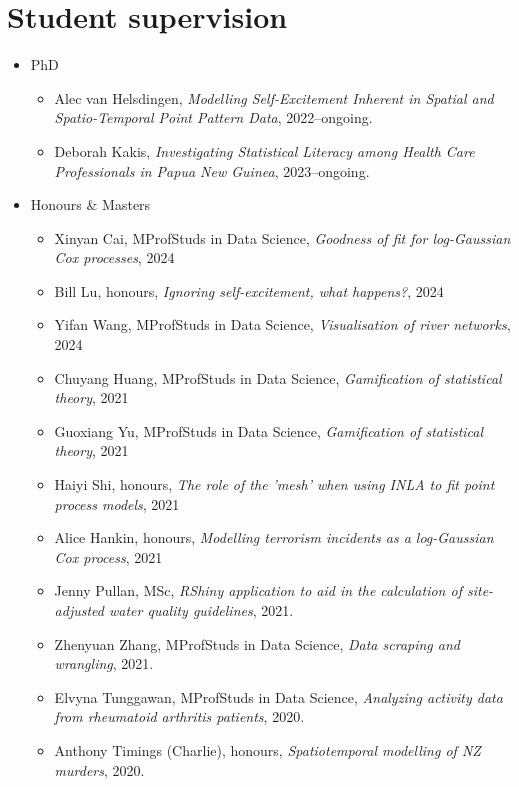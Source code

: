 \documentclass[10pt,a4paper]{moderncv}
\begin{document}
\newpage
\section{Student supervision}

\vspace{6pt}

\begin{itemize}
  \item PhD
  \begin{itemize}
  \item Alec van Helsdingen, \textit{Modelling Self-Excitement Inherent in Spatial and Spatio-Temporal Point Pattern Data}, 2022--ongoing.
   \item Deborah Kakis, \textit{Investigating Statistical Literacy among Health Care Professionals in Papua New Guinea}, 2023--ongoing.
  \end{itemize}
\item Honours \& Masters
  \begin{itemize}
  \item Xinyan Cai, MProfStuds in Data Science, \textit{Goodness of fit for log-Gaussian Cox processes}, 2024 
  \item Bill Lu, honours, \textit{Ignoring self-excitement, what happens?}, 2024
  \item Yifan Wang, MProfStuds in Data Science, \textit{Visualisation of river networks}, 2024
  \item Chuyang Huang, MProfStuds in Data Science, \textit{Gamification of statistical theory}, 2021
  \item Guoxiang Yu, MProfStuds in Data Science, \textit{Gamification of statistical theory}, 2021
  \item Haiyi Shi, honours, \textit{The role of the 'mesh' when using INLA to fit point process models}, 2021
  \item Alice Hankin, honours, \textit{Modelling terrorism incidents as a log-Gaussian Cox process}, 2021
  \item Jenny Pullan, MSc, \textit{RShiny application to aid in the calculation of site-adjusted water quality guidelines}, 2021.
  \item Zhenyuan Zhang, MProfStuds in Data Science, \textit{Data scraping and wrangling}, 2021.
  \item Elvyna Tunggawan, MProfStuds in Data Science, \textit{Analyzing activity data from rheumatoid arthritis patients}, 2020.
  \item Anthony Timings (Charlie), honours, \textit{Spatiotemporal modelling of NZ murders}, 2020.
  \end{itemize}
\end{itemize}
\end{document}

